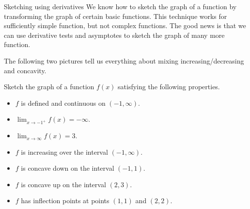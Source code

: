 \documentclass[../main.tex]{subfiles}
\begin{document}
\begin{lesson}{Sketching using derivatives}
  We know how to sketch the graph of a function by transforming the graph of certain basic functions.  This technique works for sufficiently simple function, but not complex functions. The good news is that we can use derivative tests and asymptotes to sketch the graph of many more function.

  The following two pictures tell us everything about mixing increasing/decreasing and concavity.
  \begin{center}
    \hspace{1in}
  \end{center}

  \begin{example}
    Sketch the graph of a function \(f(x)\) satisfying the following properties.
    \begin{itemize}
      \item \(f\) is defined and continuous on \((-1, \infty)\).
      \item \(\lim_{x \to -1^{+}} f(x) = -\infty\).
      \item \(\lim_{x \to \infty} f(x) = 3\).
      \item \(f\) is increasing over the interval \((-1,\infty)\).
      \item \(f\) is concave down on the interval \((-1,1)\).
      \item \(f\) is concave up on the interval \((2, 3)\).
      \item \(f\) has inflection points at points \((1,1)\) and \((2,2)\).
    \end{itemize}

  \end{example}
\end{lesson}
\end{document}
